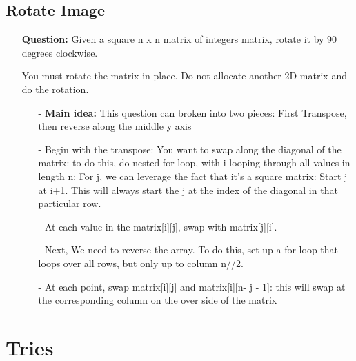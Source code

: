 \documentclass[12pt]{article}
\begin{document}
\subsection{Rotate Image}
\begin{enumerate}
  \item[] \textbf{Question:} Given a square n x n matrix of integers matrix, rotate it by 90 degrees clockwise.

You must rotate the matrix in-place. Do not allocate another 2D matrix and do the rotation.

    \begin{enumerate}
      \item[-] \textbf{Main idea:} This question can broken into two pieces: First Transpose, then reverse along the middle y axis
      \item[-] Begin with the transpose: You want to swap along the diagonal of the matrix: to do this, do nested for loop, with i looping through all values in length n: For j, we can leverage the fact that it's a square matrix: Start j at i+1. This will always start the j at the index of the diagonal in that particular row.
      \item[-] At each value in the matrix[i][j], swap with matrix[j][i].
      \item[-] Next, We need to reverse the array. To do this, set up a for loop that loops over all rows, but only up to column n//2. 
      \item[-] At each point, swap matrix[i][j] and matrix[i][n- j - 1]: this will swap at the corresponding column on the over side of the matrix

    \end{enumerate}
\end{enumerate}






\section{Tries}
\end{document}
